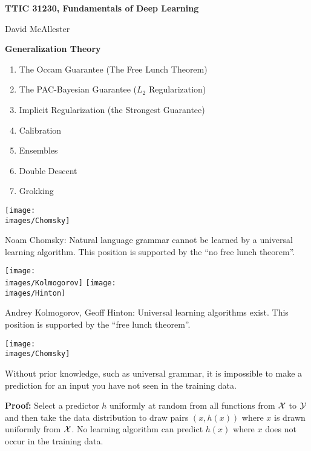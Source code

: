 




{\Huge


\centerline{\bf TTIC 31230, Fundamentals of Deep Learning}
\bigskip
\centerline{David McAllester}

\vfill
\centerline{\bf Generalization Theory}

\begin{enumerate}
\item The Occam Guarantee (The Free Lunch Theorem)
\item The PAC-Bayesian Guarantee ($L_2$ Regularization)
\item Implicit Regularization (the Strongest Guarantee)
\item Calibration
\item Ensembles
\item Double Descent
\item Grokking
\end{enumerate}

\vfill
\vfill


\texttt{[image: \\images/Chomsky]} \begin{minipage}[b]{8in} Noam Chomsky: 
Natural language grammar cannot be learned by a universal learning algorithm.
This position is supported by the ``no free lunch theorem''.\end{minipage}

\vfill
\texttt{[image: \\images/Kolmogorov]}
\texttt{[image: \\images/Hinton]}
\begin{minipage}[b]{7in}
Andrey Kolmogorov, Geoff Hinton: Universal learning algorithms exist. This position is supported by the ``free lunch theorem''.
\end{minipage}


\texttt{[image: \\images/Chomsky]} 

Without prior knowledge, such as universal grammar, it is impossible to make a prediction for an input you have not seen in the training data.


\vfill
{\bf Proof:} Select a predictor $h$ uniformly at random from all functions from ${\cal X}$ to ${\cal Y}$ and then take the data distribution to draw pairs $(x, h(x))$
where $x$ is drawn uniformly from ${\cal X}$.  No learning algorithm can predict $h(x)$ where $x$ does not occur in the training data.


}
